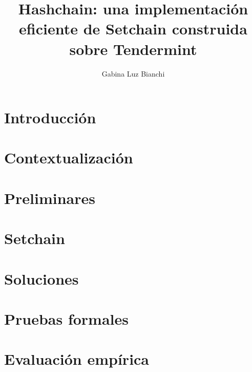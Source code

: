 \documentclass[a4paper, 11pt]{book}
\title{Hashchain: una implementación eficiente de Setchain construida sobre Tendermint}
\author{Gabina Luz Bianchi}
\begin{document}


%

\tableofcontents{}

\begin{sloppypar}

\chapter{Introducción}


\chapter{Contextualización}


\chapter{Preliminares}


\chapter{Setchain}\label{chapter:setchain}


\chapter{Soluciones}\label{chapter:sol}


\chapter{Pruebas formales}


\chapter{Evaluación empírica}



\end{sloppypar}
\end{document}
